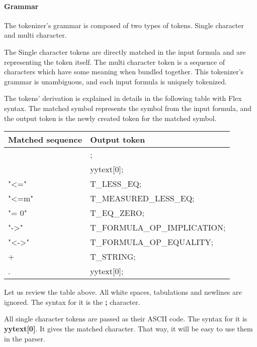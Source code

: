 \documentclass{article}
\begin{document}
	\paragraph{Grammar} The tokenizer's grammar is composed of two types of tokens. Single character and multi character.

	The Single character tokens are directly matched in the input formula and are representing the token itself.
	The multi character token is a sequence of characters which have some meaning when bundled together.
	This tokenizer's grammar is unambiguous, and each input formula is uniquely tokenized.

	The tokens' derivation is explained in details in the following table with Flex syntax. The matched symbol represents the symbol from the input formula, and the output token is the newly created token for the matched symbol.

		\begin{flushleft}
			\centering
			\begin{tabular}{ | m{10em} | m{15em}| } 
				\hline
					\textbf{Matched sequence} & \textbf{Output token} \\ [0.7ex] 
				\hline
					[ \textbackslash t\textbackslash  n] & ; \\
				\hline
					[,TF01()C\&|~*+-] 	& yytext[0];  \\
				\hline
				    "<="            &   T\_LESS\_EQ; \\
				\hline
				    "<=m"           &   T\_MEASURED\_LESS\_EQ; \\
				\hline
				    "= 0"           &   T\_EQ\_ZERO; \\
				\hline
				    "->"            &   T\_FORMULA\_OP\_IMPLICATION; \\
				\hline
				    "<->"           &   T\_FORMULA\_OP\_EQUALITY; \\
				\hline
				    [a-zA-Z0-9]+    &   T\_STRING; \\
				\hline
				    .               &   yytext[0]; \\
				\hline
			\end{tabular}
		\end{flushleft}
	Let us review the table above. All white spaces, tabulations and newlines are ignored. The syntax for it is the \textbf{;} character.

	All single character tokens are passed as their ASCII code. The syntax for it is \textbf{yytext[0]}. It gives the matched character. That way, it will be easy to use them in the parser.
\end{document}
